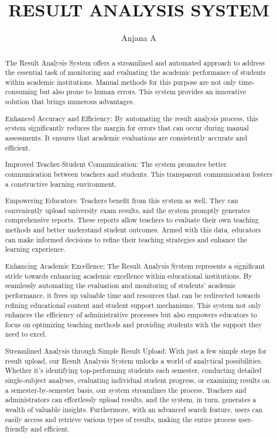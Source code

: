 \documentclass{nascproject}
\title{RESULT ANALYSIS SYSTEM}
\author{Anjana A}
\begin{document}
\maketitle

\makecert

\newpage
\setcounter{page}{1}
\renewcommand\abstractname{ABSTRACT}
\begin{abstract}
\vspace{5cm}

The Result Analysis System offers a streamlined and automated approach to address the essential task of monitoring and evaluating the academic performance of students within academic institutions. Manual methods for this purpose are not only time-consuming but also prone to human errors. This system provides an innovative solution that brings numerous advantages.

Enhanced Accuracy and Efficiency: By automating the result analysis process, this system significantly reduces the margin for errors that can occur during manual assessments. It ensures that academic evaluations are consistently accurate and efficient.

Improved Teacher-Student Communication: The system promotes better communication between teachers and students. This transparent communication fosters a constructive learning environment.

Empowering Educators: Teachers benefit from this system as well. They can conveniently upload university exam results, and the system promptly generates comprehensive reports. These reports allow teachers to evaluate their own teaching methods and better understand student outcomes. Armed with this data, educators can make informed decisions to refine their teaching strategies and enhance the learning experience.

Enhancing Academic Excellence: The Result Analysis System represents a significant stride towards enhancing academic excellence within educational institutions. By seamlessly automating the evaluation and monitoring of students' academic performance, it frees up valuable time and resources that can be redirected towards refining educational content and student support mechanisms. This system not only enhances the efficiency of administrative processes but also empowers educators to focus on optimizing teaching methods and providing students with the support they need to excel.


Streamlined Analysis through Simple Result Upload: With just a few simple steps for result upload, our Result Analysis System unlocks a world of analytical possibilities. Whether it's identifying top-performing students each semester, conducting detailed single-subject analyses, evaluating individual student progress, or examining results on a semester-by-semester basis, our system streamlines the process. Teachers and administrators can effortlessly upload results, and the system, in turn, generates a wealth of valuable insights. Furthermore, with an advanced search feature, users can easily access and retrieve various types of results, making the entire process user-friendly and efficient.



\end{abstract}
\end{document}
